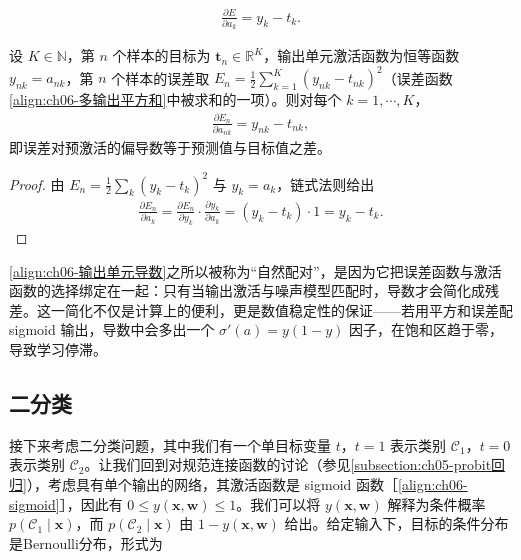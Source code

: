 \documentclass[../../main.tex]{subfiles}
\begin{document}
\begin{align}
\frac{\partial E}{\partial a_k}=y_k-t_k.
\label{align:ch06-输出单元导数}
\end{align}

\begin{proposition}[恒等输出单元的误差导数]\label{proposition:ch06-恒等输出导数}
设 $K\in\mathbb{N}$，第 $n$ 个样本的目标为 $\boldsymbol{t}_{n}\in\mathbb{R}^{K}$，输出单元激活函数为恒等函数 $y_{nk}=a_{nk}$，第 $n$ 个样本的误差取 $E_{n}=\frac{1}{2}\sum_{k=1}^{K}(y_{nk}-t_{nk})^{2}$（误差函数\eqref{align:ch06-多输出平方和}中被求和的一项）。则对每个 $k=1,\cdots,K$，
\begin{align}
\frac{\partial E_n}{\partial a_{nk}}=y_{nk}-t_{nk},
\label{align:ch06-恒等输出导数}
\end{align}
即误差对预激活的偏导数等于预测值与目标值之差。
\end{proposition}

\begin{proof}
由 $E_n=\frac{1}{2}\sum_{k}(y_k-t_k)^{2}$ 与 $y_k=a_k$，链式法则给出
\begin{align}
\frac{\partial E_n}{\partial a_k}=\frac{\partial E_n}{\partial y_k}\cdot\frac{\partial y_k}{\partial a_k}=(y_k-t_k)\cdot1=y_k-t_k.
\end{align}
\end{proof}

\begin{remark}\eqref{align:ch06-输出单元导数}之所以被称为“自然配对”，是因为它把误差函数与激活函数的选择绑定在一起：只有当输出激活与噪声模型匹配时，导数才会简化成残差。这一简化不仅是计算上的便利，更是数值稳定性的保证——若用平方和误差配 sigmoid 输出，导数中会多出一个 $\sigma'(a)=y(1-y)$ 因子，在饱和区趋于零，导致学习停滞。
\end{remark}

\subsection{二分类}\label{subsection:ch06-二分类}

接下来考虑二分类问题，其中我们有一个单目标变量 $t$，$t=1$ 表示类别 $\mathcal{C}_1$，$t=0$ 表示类别 $\mathcal{C}_2$。让我们回到对规范连接函数的讨论（参见\cref{subsection:ch05-probit回归}），考虑具有单个输出的网络，其激活函数是 sigmoid 函数［\eqref{align:ch06-sigmoid}］，因此有 $0\leqslant y(\boldsymbol{x},\boldsymbol{w})\leqslant1$。我们可以将 $y(\boldsymbol{x},\boldsymbol{w})$ 解释为条件概率 $p(\mathcal{C}_1\mid\boldsymbol{x})$，而 $p(\mathcal{C}_2\mid\boldsymbol{x})$ 由 $1-y(\boldsymbol{x},\boldsymbol{w})$ 给出。给定输入下，目标的条件分布是Bernoulli分布，形式为
\end{document}
